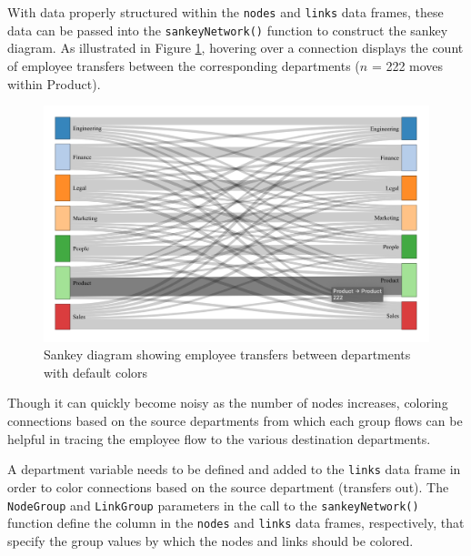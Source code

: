 \documentclass[
]{book}
\begin{document}
With data properly structured within the \texttt{nodes} and \texttt{links} data frames, these data can be passed into the \texttt{sankeyNetwork()} function to construct the sankey diagram. As illustrated in Figure \ref{fig:sankey-1}, hovering over a connection displays the count of employee transfers between the corresponding departments (\(n\) = 222 moves within Product).

\begin{figure}

{\centering \includegraphics[width=1\linewidth]{graphics/sankey_1} 

}

\caption{Sankey diagram showing employee transfers between departments with default colors}\label{fig:sankey-1}
\end{figure}

Though it can quickly become noisy as the number of nodes increases, coloring connections based on the source departments from which each group flows can be helpful in tracing the employee flow to the various destination departments.

A department variable needs to be defined and added to the \texttt{links} data frame in order to color connections based on the source department (transfers out). The \texttt{NodeGroup} and \texttt{LinkGroup} parameters in the call to the \texttt{sankeyNetwork()} function define the column in the \texttt{nodes} and \texttt{links} data frames, respectively, that specify the group values by which the nodes and links should be colored.
\end{document}
